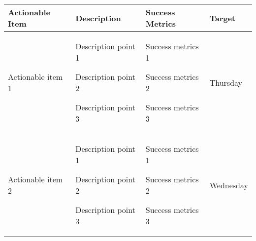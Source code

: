 \begin{table}[!h]
    \centering
    \begin{tabularx}{\textwidth}{|X|X|X|l|}
        \hline
        Actionable Item & Description & Success Metrics & Target \\
        \hline
        \hline
        Actionable item 1 &
        \begin{myitemize}
            \item Description point 1
            \item Description point 2
            \item Description point 3
        \end{myitemize} &
        \begin{myitemize}
            \item Success metrics 1
            \item Success metrics 2
            \item Success metrics 3
        \end{myitemize} &
        Thursday \\
        \hline
        Actionable item 2 &
        \begin{myitemize}
            \item Description point 1
            \item Description point 2
            \item Description point 3
        \end{myitemize} &
        \begin{myitemize}
            \item Success metrics 1
            \item Success metrics 2
            \item Success metrics 3
        \end{myitemize} &
        Wednesday \\
        \hline
    \end{tabularx}
\end{table}
